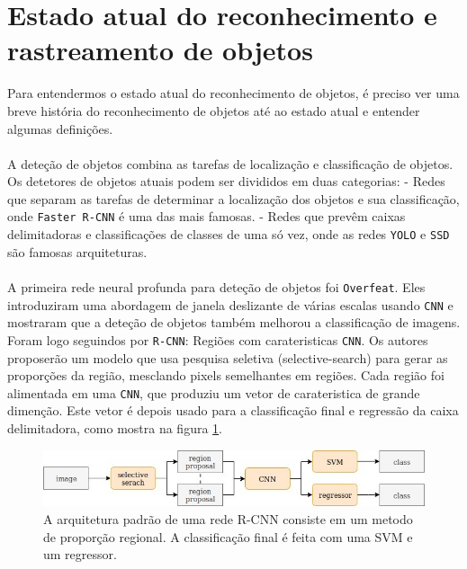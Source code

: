 \section{Estado atual do reconhecimento e rastreamento de objetos}
\label{chap2:sec:estadoatual}

Para entendermos o estado atual do reconhecimento de objetos, é preciso ver uma breve história do reconhecimento de objetos até ao estado atual e entender algumas definições.

\paragraph{}
A deteção de objetos combina as tarefas de localização e classificação de objetos. Os detetores de objetos atuais podem ser divididos em duas categorias:
\newline - Redes que separam as tarefas de determinar a localização dos objetos e sua classificação, onde \texttt{Faster \ac{R-CNN}} é uma das mais famosas.
\newline - Redes que prevêm caixas delimitadoras e classificações de classes de uma só vez, onde as redes \texttt{\ac{YOLO}} e \texttt{\ac{SSD}} são famosas arquiteturas.

\paragraph{}
A primeira rede neural profunda para deteção de objetos foi \texttt{Overfeat}. Eles introduziram uma abordagem de janela deslizante de várias escalas usando \texttt{\ac{CNN}} e mostraram que a deteção de objetos também melhorou a classificação de imagens.
Foram logo seguindos por \texttt{\ac{R-CNN}}: Regiões com carateristicas \texttt{\ac{CNN}}. Os autores proposerão um modelo que usa pesquisa seletiva (selective-search) para gerar as proporções da região, mesclando pixels semelhantes em regiões. Cada região foi alimentada em uma \texttt{\ac{CNN}}, que produziu um vetor de carateristica de grande dimenção. Este vetor é depois usado para a classificação final e regressão da caixa delimitadora, como mostra na figura \ref{img:rcnn}.


\begin{figure}[h!]
  \label{img:rcnn}
  \includegraphics[width=1\textwidth]{rcnn.jpeg}
  \caption{A arquitetura padrão de uma rede \ac{R-CNN} consiste em um metodo de proporção regional. A classificação final é feita com uma \ac{SVM} e um regressor.}
\end{figure}


